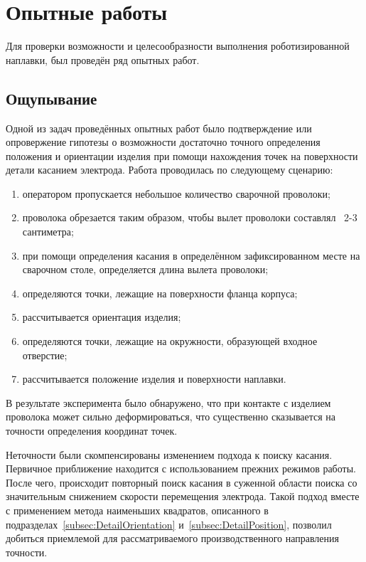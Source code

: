 \chapter{Опытные работы}
Для проверки возможности и целесообразности выполнения роботизированной наплавки, был проведён ряд опытных работ.


\section{Ощупывание}
Одной из задач проведённых опытных работ было подтверждение или опровержение гипотезы о возможности достаточно точного определения положения и ориентации изделия при помощи нахождения точек на поверхности детали касанием электрода.
Работа проводилась по следующему сценарию:

\begin{enumerate}
    \item оператором пропускается небольшое количество сварочной проволоки;
    \item проволока обрезается таким образом, чтобы вылет проволоки составлял ~2-3 сантиметра;
    \item при помощи определения касания в определённом зафиксированном месте на сварочном столе, определяется длина вылета проволоки;
    \item определяются точки, лежащие на поверхности фланца корпуса;
    \item рассчитывается ориентация изделия;
    \item определяются точки, лежащие на окружности, образующей входное отверстие;
    \item рассчитывается положение изделия и поверхности наплавки.
\end{enumerate}

В результате эксперимента было обнаружено, что при контакте с изделием проволока может сильно деформироваться, что существенно сказывается на точности определения координат точек.

Неточности были скомпенсированы изменением подхода к поиску касания.
Первичное приближение находится с использованием прежних режимов работы.
После чего, происходит повторный поиск касания в суженной области поиска со значительным снижением скорости перемещения электрода.
Такой подход вместе с применением метода наименьших квадратов, описанного в подразделах~\ref{subsec:DetailOrientation} и~\ref{subsec:DetailPosition}, позволил добиться приемлемой для рассматриваемого производственного направления точности.


